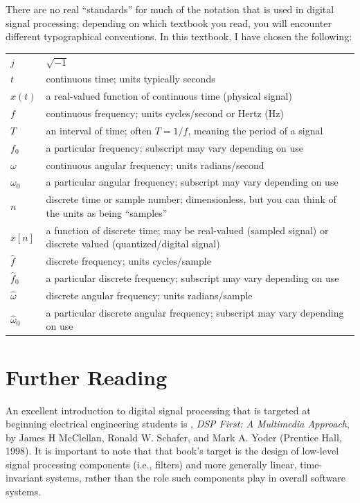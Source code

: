 There are no real ``standards'' for much of the notation that is used
in digital signal processing; depending on which textbook you read,
you will encounter different typographical conventions. In this
textbook, I have chosen the following:
\begin{center}
\begin{tabular}{lp{5in}}
  $j$    & $\sqrt{-1}$ \\
  $t$    & continuous time; units typically seconds \\
  $x(t)$ & a real-valued function of continuous time (physical signal) \\
  $f$    & continuous frequency; units cycles/second or Hertz (Hz) \\
  $T$    & an interval of time; often $T=1/f$, meaning the period of a
           signal \\
  $f_0$  & a particular frequency; subscript may vary depending on use \\
  $\omega$ & continuous angular frequency; units radians/second \\
  $\omega_0$ & a particular angular frequency; subscript may vary
               depending on use \\
  $n$    & discrete time or sample number; dimensionless, but you can
           think of the units as being ``samples'' \\
  $x[n]$ & a function of discrete time; may be real-valued (sampled
           signal) or discrete valued (quantized/digital signal) \\
  $\hat{f}$ & discrete frequency; units cycles/sample \\
  $\hat{f}_0$  & a particular discrete frequency; subscript may vary
                 depending on use \\
  $\hat{\omega}$ & discrete angular frequency; units radians/sample \\
  $\hat{\omega}_0$ & a particular discrete angular frequency; subscript may vary
               depending on use \\
\end{tabular}
\end{center}

\section*{Further Reading}

An excellent introduction to digital signal processing that is
targeted at beginning electrical engineering students is , \textit{DSP
  First: A Multimedia Approach}, by James H McClellan, Ronald
W. Schafer, and Mark A. Yoder (Prentice Hall, 1998).  It is important
to note that that book's target is the design of low-level signal
processing components (i.e., filters) and more generally linear,
time-invariant systems, rather than the role such components play in
overall software systems.
